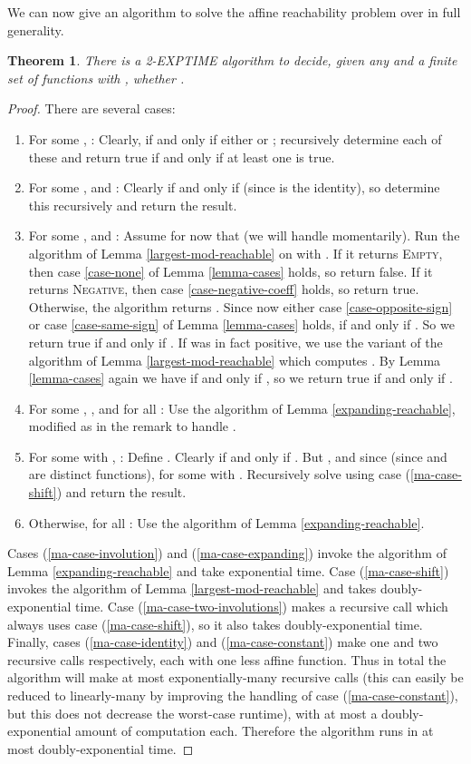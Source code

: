 \documentclass[11pt]{amsart}
\newtheorem{theorem}{Theorem}
\theoremstyle{definition}
\theoremstyle{remark}
\begin{document}
We can now give an algorithm to solve the affine reachability problem over  in full generality.

\begin{theorem} \label{main-algorithm}
There is a \textsf{2-EXPTIME} algorithm to decide, given any  and a finite set  of functions  with , whether .
\end{theorem}
\begin{proof}
There are several cases:
\begin{enumerate}
\item For some , : Clearly,  if and only if either  or ; recursively determine each of these and return true if and only if at least one is true. \label{ma-case-constant}
\item For some ,  and : Clearly  if and only if  (since  is the identity), so determine this recursively and return the result. \label{ma-case-identity}
\item For some ,  and : Assume for now that  (we will handle  momentarily). Run the algorithm of Lemma \ref{largest-mod-reachable} on  with . If it returns \textsc{Empty}, then case \ref{case-none} of Lemma \ref{lemma-cases} holds, so return false. If it returns \textsc{Negative}, then case \ref{case-negative-coeff} holds, so return true. Otherwise, the algorithm returns . Since now either case \ref{case-opposite-sign} or case \ref{case-same-sign} of Lemma \ref{lemma-cases} holds,  if and only if . So we return true if and only if . If  was in fact positive, we use the variant of the algorithm of Lemma \ref{largest-mod-reachable} which computes . By Lemma \ref{lemma-cases} again we have  if and only if , so we return true if and only if . \label{ma-case-shift}
\item For some , , and  for all : Use the algorithm of Lemma \ref{expanding-reachable}, modified as in the remark to handle . \label{ma-case-involution}
\item For some  with , : Define . Clearly  if and only if . But , and since  (since  and  are distinct functions),  for some  with . Recursively solve  using case (\ref{ma-case-shift}) and return the result. \label{ma-case-two-involutions}
\item Otherwise,  for all : Use the algorithm of Lemma \ref{expanding-reachable}. \label{ma-case-expanding}
\end{enumerate}
Cases (\ref{ma-case-involution}) and (\ref{ma-case-expanding}) invoke the algorithm of Lemma \ref{expanding-reachable} and take exponential time. Case (\ref{ma-case-shift}) invokes the algorithm of Lemma \ref{largest-mod-reachable} and takes doubly-exponential time. Case (\ref{ma-case-two-involutions}) makes a recursive call which always uses case (\ref{ma-case-shift}), so it also takes doubly-exponential time. Finally, cases (\ref{ma-case-identity}) and (\ref{ma-case-constant}) make one and two recursive calls respectively, each with one less affine function. Thus in total the algorithm will make at most exponentially-many recursive calls (this can easily be reduced to linearly-many by improving the handling of case (\ref{ma-case-constant}), but this does not decrease the worst-case runtime), with at most a doubly-exponential amount of computation each. Therefore the algorithm runs in at most doubly-exponential time.

\end{proof}
\end{document}
